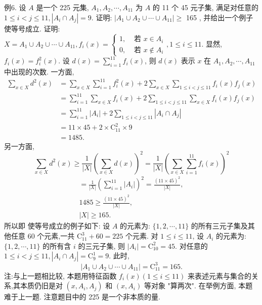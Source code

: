 例6. 设 $A$ 是一个 225 元集, $A_1, A_2, \cdots, A_{11}$ 为 $A$ 的 11 个 45 元子集, 满足对任意的 $1 \leqslant i<j \leqslant 11,\left|A_i \cap A_j\right|=9$. 证明: $\left|A_1 \cup A_2 \cup \cdots \cup A_{11}\right| \geqslant$ 165 , 并给出一个例子使等号成立.
证明: $X=A_1 \cup A_2 \cup \cdots \cup A_{11}, f_i(x)=\left\{\begin{array}{ll}1, & \text { 若 } x \in A_i \\ 0, & \text { 若 } x \notin A_i\end{array}, 1 \leqslant i \leqslant 11\right.$.
显然, $f_i(x)=f_i^2(x)$.
设 $d(x)=\sum_{i=1}^{11} f_i(x)$, 则 $d(x)$ 表示 $x$ 在 $A_1, A_2, \cdots, A_{11}$ 中出现的次数.
一方面,
$$
\begin{aligned}
\sum_{x \in X} d^2(x) & =\sum_{x \in X} \sum_{i=1}^{11} f_i^2(x)+2 \sum_{x \in X} \sum_{1 \leqslant i<j \leqslant 11} f_i(x) f_j(x) \\
& =\sum_{i=1}^{11} \sum_{x \in X} f_i(x)+2 \sum_{1 \leqslant i<j \leqslant 11} \sum_{x \in X} f_i(x) f_j(x) \\
& =\sum_{i=1}^{11}\left|A_i\right|+2 \sum_{1 \leqslant i<j \leqslant 11}\left|A_i \cap A_j\right| \\
& =11 \times 45+2 \times \mathrm{C}_{11}^2 \times 9 \\
& =1485 .
\end{aligned}
$$
另一方面,
$$
\sum_{x \in X} d^2(x) \geqslant \frac{1}{|X|}\left(\sum_{x \in X} d(x)\right)^2=\frac{1}{|X|}\left(\sum_{x \in X} \sum_{i=1}^{11} f_i(x)\right)^2
$$
$$
\begin{gathered}
=\frac{1}{|X|}\left(\sum_{i=1}^{11}\left|A_i\right|\right)^2=\frac{(11 \times 45)^2}{|X|}, \\
1485 \geqslant \frac{(11 \times 45)^2}{|X|}, \\
|X| \geqslant 165 .
\end{gathered}
$$
所以即
使等号成立的例子如下:
设 $A$ 的元素为: $\{1,2, \cdots, 11\}$ 的所有三元子集及其他任意 60 个元素,一共 $\mathrm{C}_{11}^3+60=225$ 个元素.
对 $1 \leqslant i \leqslant 11$, 设 $A_i$ 的元素为: $\{1,2, \cdots, 11\}$ 的所有含 $i$ 的三元子集, 则 $\left|A_i\right|=\mathrm{C}_{10}^2=45$.
对任意的 $1 \leqslant i<j \leqslant 11,\left|A_i \cap A_j\right|=\mathrm{C}_9^1=9$. 此时,
$$
\left|A_1 \cup A_2 \cup \cdots \cup A_{11}\right|=\mathrm{C}_{11}^3=165 .
$$
注:与上一题相比较, 本题用特征函数 $f_i(x)(1 \leqslant i \leqslant 11)$ 来表述元素与集合的关系,其本质仍旧是对 $\left(x, A_i, A_j\right)$ 和 $\left(x, A_i\right)$ 等对象 "算两次". 在举例方面, 本题难于上一题.
注意题目中的 225 是一个非本质的量.



